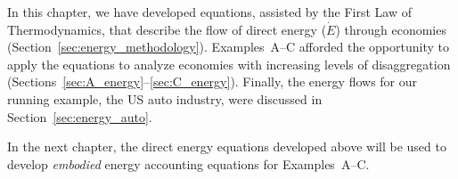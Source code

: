 In this chapter, we have developed equations, 
assisted by the First Law of Thermodynamics,
that describe the flow of 
direct energy ($\dot{E}$) through economies (Section~\ref{sec:energy_methodology}).
Examples~A--C afforded the opportunity to apply the equations to %
analyze economies with increasing levels of disaggregation
(Sections~\ref{sec:A_energy}--\ref{sec:C_energy}). 
Finally, the energy flows for our running example, the US auto industry,
were discussed in Section~\ref{sec:energy_auto}.

In the next chapter, the direct energy equations developed above will be used to 
develop \emph{embodied} energy accounting equations for Examples~A--C. %












%
%


